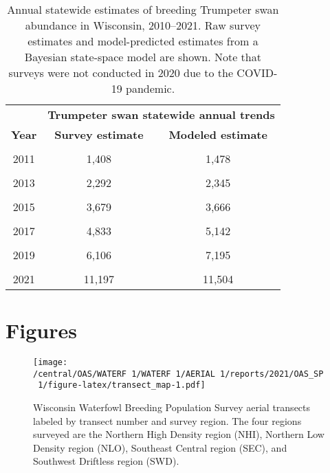 \documentclass[
  12pt,
]{article}
\begin{document}
\newpage

\begin{table}[!h]

\caption{\label{tab:trump_tab}Annual statewide estimates of breeding Trumpeter swan abundance in Wisconsin, 2010--2021. Raw survey estimates and model-predicted estimates from a Bayesian state-space model are shown. Note that surveys were not conducted in 2020 due to the COVID-19 pandemic.}
\centering
\begin{tabular}[t]{ccc}
\toprule
\multicolumn{1}{c}{\textbf{ }} & \multicolumn{2}{c}{\textbf{Trumpeter swan statewide annual trends}} \\
\cmidrule(l{3pt}r{3pt}){2-3}
\textbf{Year} & \textbf{Survey estimate} & \textbf{Modeled estimate}\\
\midrule
\cellcolor{gray!6}{2010} & \cellcolor{gray!6}{1,237} & \cellcolor{gray!6}{1,205}\\
2011 & 1,408 & 1,478\\
\cellcolor{gray!6}{2012} & \cellcolor{gray!6}{1,999} & \cellcolor{gray!6}{1,908}\\
2013 & 2,292 & 2,345\\
\cellcolor{gray!6}{2014} & \cellcolor{gray!6}{2,979} & \cellcolor{gray!6}{2,956}\\
2015 & 3,679 & 3,666\\
\cellcolor{gray!6}{2016} & \cellcolor{gray!6}{5,029} & \cellcolor{gray!6}{4,581}\\
2017 & 4,833 & 5,142\\
\cellcolor{gray!6}{2018} & \cellcolor{gray!6}{5,677} & \cellcolor{gray!6}{6,078}\\
2019 & 6,106 & 7,195\\
\cellcolor{gray!6}{2020} & \cellcolor{gray!6}{} & \cellcolor{gray!6}{9,750}\\
2021 & 11,197 & 11,504\\
\bottomrule
\end{tabular}
\end{table}

\newpage

\hypertarget{figures}{%
\section{Figures}\label{figures}}

\begin{figure}
\centering
\texttt{[image: /central/OAS/WATERF~1/WATERF~1/AERIAL~1/reports/2021/OAS\_SP~1/figure-latex/transect\_map-1.pdf]}
\caption{\label{fig:transect_map}Wisconsin Waterfowl Breeding Population
Survey aerial transects labeled by transect number and survey region.
The four regions surveyed are the Northern High Density region (NHI),
Northern Low Density region (NLO), Southeast Central region (SEC), and
Southwest Driftless region (SWD).}
\end{figure}
\end{document}

